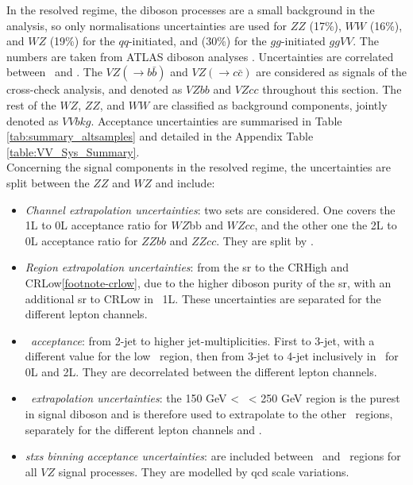 In the resolved regime, the diboson processes are a small background in the analysis, so only normalisations uncertainties are used for $ZZ$ (17\%), $WW$ (16\%), and $WZ$ (19\%) for the $qq$-initiated, and (30\%) for the $gg$-initiated $ggVV$. The numbers are taken from ATLAS diboson analyses \cite{ATL-PHYS-PUB-2023-007}. Uncertainties are correlated between \vhb\ and \vhc. The $VZ (\rightarrow b\bar{b})$ and $VZ (\rightarrow c\bar{c})$ are considered as signals of the cross-check analysis, and denoted as $VZbb$ and $VZcc$ throughout this section. The rest of the $WZ$, $ZZ$, and $WW$ are classified as background components, jointly denoted as $VVbkg$. Acceptance uncertainties are summarised in Table \ref{tab:summary_altsamples} and detailed in the Appendix Table \ref{table:VV_Sys_Summary}. \\

Concerning the signal components in the resolved regime, the uncertainties are split between the $ZZ$ and $WZ$ and include:
\begin{itemize}[leftmargin=*]
    \item \textit{Channel extrapolation uncertainties}: two sets are considered. One covers the 1L to 0L acceptance ratio for $WZ$bb and $WZcc$, and the other one the 2L to 0L acceptance ratio for $ZZbb$ and $ZZcc$. They are split by \nj.
    \item \textit{Region extrapolation uncertainties}: from the \gls{sr} to the CRHigh and CRLow\cref{footnote-crlow}, due to the higher diboson purity of the \gls{sr}, with an additional \gls{sr} to CRLow in \vhb\ 1L. These uncertainties are separated for the different lepton channels.
    \item \textit{\nj\ acceptance}: from 2-jet to higher jet-multiplicities. First to 3-jet, with a different value for the low \ptv\ region, then from 3-jet to 4-jet inclusively in \ptv\ for 0L and 2L. They are decorrelated between the different lepton channels.
    \item \textit{\ptv\ extrapolation uncertainties}: the 150 GeV < \ptv\ < 250 GeV region is the purest in signal diboson and is therefore used to extrapolate to the other \ptv\ regions, separately for the different lepton channels and \nj.
    \item \textit{\gls{stxs} binning acceptance uncertainties}: are included between \nj\ and \ptv\ regions for all $VZ$ signal processes. They are modelled by \gls{qcd} scale variations. 
\end{itemize}


